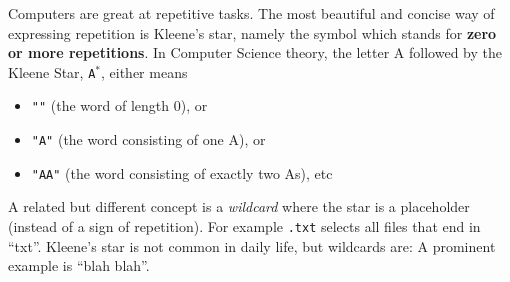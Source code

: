 
Computers are great at repetitive tasks. The most beautiful and
concise way of expressing repetition is Kleene's star, namely the
symbol {\tt *} which stands for \textbf{zero or more repetitions}. In
Computer Science theory, the letter A followed by the Kleene Star,
{\tt A$^{*}$}, either means

\begin{itemize}
         0.5em%
         \leftmargini%
        \addtolength{}
        \itemindent 1.5em%

  \item {\tt ""} (the word of length 0), or
  \item {\tt "A"} (the word consisting of one A), or
  \item {\tt "AA"} (the word consisting of exactly two As), etc
\end{itemize}

\noindent
A related but different concept is a \emph{wildcard} where the star is a
placeholder (instead of a sign of repetition). For example {\tt *.txt}
selects all files that end in ``txt''. Kleene's star is not common in
daily life, but wildcards are: A prominent example is ``blah blah''.

